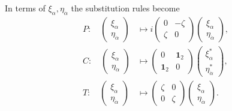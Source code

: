 In terms of $\xi_\alpha,\eta_{\dot\alpha}$ the substitution rules become
\begin{equation}
\begin{aligned}
  P:\quad
  \begin{pmatrix}\xi_\alpha\\\eta_{\dot\alpha}\end{pmatrix}
  &\longmapsto
  i\begin{pmatrix}0&-\zeta\\\zeta&0\end{pmatrix}
  \begin{pmatrix}\xi_\alpha\\\eta_{\dot\alpha}\end{pmatrix},\\
  C:\quad
  \begin{pmatrix}\xi_\alpha\\\eta_{\dot\alpha}\end{pmatrix}
  &\longmapsto
  \begin{pmatrix}0&\mathbf{1}_2\\\mathbf{1}_2&0\end{pmatrix}
  \begin{pmatrix}\xi_\alpha^*\\\eta_{\dot\alpha}^*\end{pmatrix},\\
  T:\quad
  \begin{pmatrix}\xi_\alpha\\\eta_{\dot\alpha}\end{pmatrix}
  &\longmapsto
  \begin{pmatrix}\zeta&0\\0&\zeta\end{pmatrix}
  \begin{pmatrix}\xi_\alpha\\\eta_{\dot\alpha}\end{pmatrix}.
\end{aligned}
\tag{1-47}\label{eq:ch1-two-component-pct-rules}
\end{equation}

